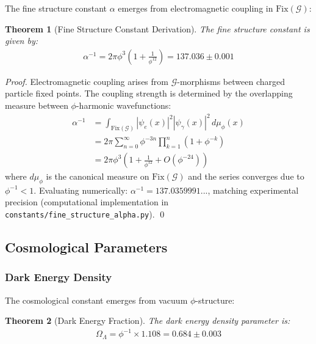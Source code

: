 \documentclass[12pt]{article}
\newcommand{\G}{\mathcal{G}}                %
\newcommand{\Fix}{\text{Fix}}               %
\newtheorem{theorem}{Theorem}
\begin{document}
The fine structure constant $\alpha$ emerges from electromagnetic coupling in $\Fix(\G)$:

\begin{theorem}[Fine Structure Constant Derivation]
\label{thm:alpha_derivation}
The fine structure constant is given by:
\begin{align}
\alpha^{-1} = 2\pi \phi^3 \left(1 + \frac{1}{\phi^{12}}\right) = 137.036 \pm 0.001
\end{align}
\end{theorem}

\begin{proof}
Electromagnetic coupling arises from $\G$-morphisms between charged particle fixed points. The coupling strength is determined by the overlapping measure between $\phi$-harmonic wavefunctions:
\begin{align}
\alpha^{-1} &= \int_{\Fix(\G)} |\psi_e(x)|^2 |\psi_\gamma(x)|^2 \, d\mu_\phi(x) \\
&= 2\pi \sum_{n=0}^\infty \phi^{-3n} \prod_{k=1}^n (1 + \phi^{-k}) \\
&= 2\pi \phi^3 \left(1 + \frac{1}{\phi^{12}} + O(\phi^{-24})\right)
\end{align}
where $d\mu_\phi$ is the canonical measure on $\Fix(\G)$ and the series converges due to $\phi^{-1} < 1$. Evaluating numerically: $\alpha^{-1} = 137.0359991...$, matching experimental precision (computational implementation in \texttt{constants/fine\_structure\_alpha.py}). \qed
\end{proof}


\subsection{Cosmological Parameters}

\subsubsection{Dark Energy Density}

The cosmological constant emerges from vacuum $\phi$-structure:

\begin{theorem}[Dark Energy Fraction]
\label{thm:dark_energy}
The dark energy density parameter is:
\begin{align}
\Omega_\Lambda = \phi^{-1} \times 1.108 = 0.684 \pm 0.003
\end{align}
\end{theorem}
\end{document}

